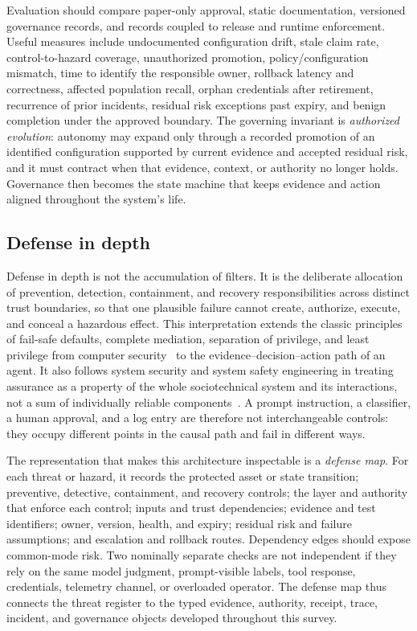 Evaluation should compare paper-only approval, static documentation, versioned governance records, and records coupled to release and runtime enforcement. Useful measures include undocumented configuration drift, stale claim rate, control-to-hazard coverage, unauthorized promotion, policy/configuration mismatch, time to identify the responsible owner, rollback latency and correctness, affected population recall, orphan credentials after retirement, recurrence of prior incidents, residual risk exceptions past expiry, and benign completion under the approved boundary. The governing invariant is \emph{authorized evolution}: autonomy may expand only through a recorded promotion of an identified configuration supported by current evidence and accepted residual risk, and it must contract when that evidence, context, or authority no longer holds. Governance then becomes the state machine that keeps evidence and action aligned throughout the system's life.

\subsection{Defense in depth}

Defense in depth is not the accumulation of filters. It is the deliberate allocation of prevention, detection, containment, and recovery responsibilities across distinct trust boundaries, so that one plausible failure cannot create, authorize, execute, and conceal a hazardous effect. This interpretation extends the classic principles of fail-safe defaults, complete mediation, separation of privilege, and least privilege from computer security~\cite{saltzer1975protection} to the evidence--decision--action path of an agent. It also follows system security and system safety engineering in treating assurance as a property of the whole sociotechnical system and its interactions, not a sum of individually reliable components~\cite{ross2022trustworthysystems,leveson2012saferworld}. A prompt instruction, a classifier, a human approval, and a log entry are therefore not interchangeable controls: they occupy different points in the causal path and fail in different ways.

The representation that makes this architecture inspectable is a \emph{defense map}. For each threat or hazard, it records the protected asset or state transition; preventive, detective, containment, and recovery controls; the layer and authority that enforce each control; inputs and trust dependencies; evidence and test identifiers; owner, version, health, and expiry; residual risk and failure assumptions; and escalation and rollback routes. Dependency edges should expose common-mode risk. Two nominally separate checks are not independent if they rely on the same model judgment, prompt-visible labels, tool response, credentials, telemetry channel, or overloaded operator. The defense map thus connects the threat register to the typed evidence, authority, receipt, trace, incident, and governance objects developed throughout this survey.

